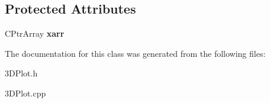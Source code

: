 \subsection*{Protected Attributes}
\begin{DoxyCompactItemize}
\item 
\hypertarget{class_c3_d_plot_a7806dad02a813aafc66d78326df7f610}{C\-Ptr\-Array {\bfseries xarr}}\label{class_c3_d_plot_a7806dad02a813aafc66d78326df7f610}

\end{DoxyCompactItemize}


The documentation for this class was generated from the following files\-:\begin{DoxyCompactItemize}
\item 
3\-D\-Plot.\-h\item 
3\-D\-Plot.\-cpp\end{DoxyCompactItemize}
